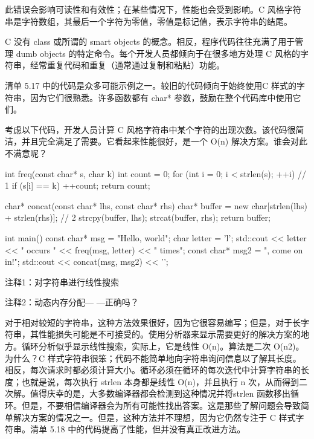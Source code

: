 此错误会影响可读性和有效性；在某些情况下，性能也会受到影响。C 风格字符串是字符数组，其最后一个字符为零值，零值是标记值，表示字符串的结尾。


C 没有 class 或所谓的 smart objects 的概念。相反，程序代码往往充满了用于管理 dumb objects 的特定命令。每个开发人员都倾向于在很多地方处理 C 风格的字符串，经常重复代码和重复（通常通过复制和粘贴）功能。

清单 5.17 中的代码是众多可能示例之一。较旧的代码倾向于始终使用C 样式的字符串，因为它们很熟悉。许多函数都有 char* 参数，鼓励在整个代码库中使用它们。

考虑以下代码，开发人员计算 C 风格字符串中某个字符的出现次数。该代码很简洁，并且完全满足了需要。它看起来性能很好，是一个 O(n) 解决方案。谁会对此不满意呢？


\begin{cpp}
int freq(const char* s, char k) {
  int count = 0;
  for (int i = 0; i < strlen(s); ++i) // 1
    if (s[i] == k)
      ++count;
  return count;
}

char* concat(const char* lhs, const char* rhs) {
  char* buffer = new char[strlen(lhs) + strlen(rhs)]; // 2
  strcpy(buffer, lhs);
  strcat(buffer, rhs);
  return buffer;
}

int main() {
  const char* msg = "Hello, world";
  char letter = 'l';
  std::cout << letter << " occurs " << freq(msg, letter) << " times\n";
  const char* msg2 = ", come on in!";
  std::cout << concat(msg, msg2) << '\n';
}
\end{cpp}

{\footnotesize
注释1：对字符串进行线性搜索

注释2：动态内存分配— —正确吗？
}


对于相对较短的字符串，这种方法效果很好，因为它很容易编写；但是，对于长字符串，其性能损失可能是不可接受的。使用分析器来显示需要更好的解决方案的地方。循环分析似乎显示线性搜索，实际上，它是线性 O(n)。算法是二次 O(n2)。为什么？C 样式字符串很笨；代码不能简单地向字符串询问信息以了解其长度。相反，每次请求时都必须计算大小。循环必须在循环的每次迭代中计算字符串的长度；也就是说，每次执行 strlen 本身都是线性 O(n)，并且执行 n 次，从而得到二次解。值得庆幸的是，大多数编译器都会检测到这种情况并将strlen 函数移出循环。但是，不要相信编译器会为所有可能性找出答案。这是那些了解问题会导致简单解决方案的情况之一。但是，这种方法并不理想，因为它仍然专注于 C 样式字符串。清单 5.18 中的代码提高了性能，但并没有真正改进方法。

